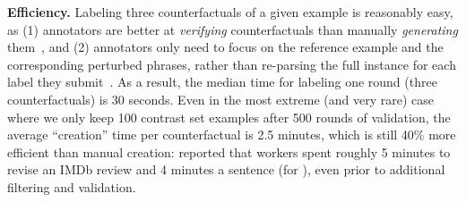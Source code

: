\textbf{Efficiency.}
Labeling three counterfactuals of a given example is reasonably easy, as (1) annotators are better at \emph{verifying} counterfactuals than manually \emph{generating} them~\cite{ribeiro2018sear}, and (2) annotators only need to focus on the reference example and the corresponding perturbed phrases, rather than re-parsing the full instance for each label they submit~\cite{Khashabi2020MoreBF}.
As a result, the median time for labeling one round (three counterfactuals) is 30 seconds.
Even in the most extreme (and very rare) case where we only keep 100 contrast set examples after 500 rounds of validation, the average ``creation'' time per counterfactual is 2.5 minutes, which is still 40\% more efficient than manual creation:
\citet{kaushik2019learning} reported that workers spent roughly 5 minutes to revise an IMDb review and 4 minutes a sentence (for \nli), even prior to additional filtering and validation.










